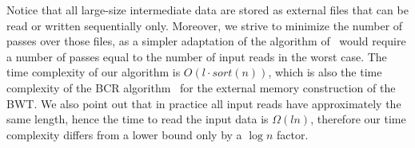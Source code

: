 \documentclass[runningheads,envcountsame,a4paper]{llncs}
\begin{document}
Notice that all large-size intermediate data are stored as external files that
can be read or written sequentially only.
Moreover, we strive to minimize the number of passes over those files, as a
simpler adaptation of the algorithm of~\cite{Bauer2011} would require a number
of passes equal to the number of input reads in the worst case.
The time complexity of our algorithm is $O(l \cdot  sort(n))$, which is also the
time complexity of the BCR algorithm~\cite{Bauer2013} for the external memory
construction of the BWT.
We also point out that in practice all input reads have approximately the same
length, hence the time to read the input data is $\Omega(ln)$, therefore our
time complexity differs from a lower bound only by a $\log n$ factor.








\begin{comment}
--------- non so dove vada-----------------


A key observation in our work is the fact that due to the fact that a
BWT consists of the symbols that precedes the lexicographic ordering of
suffixes of the reads of a collection, it is possible to "walk"
consecutively on the BWT of the collection of reads and of the reversed
version of the reads and then building a forward and backward extension
of a $Q$-substring by symbols of the alphabet lexicographically ordered.
All this can be done entirely using files for each symbol of the
alphabet and files for the BWT and its reversed version.
\end{comment}


\begin{comment}
descrizione The FM-index .... [inserire citazione FM-index]

With the advent of NGS data, the investigation of the BWT has moved
towards its use in indexing huge collections of texts, represented by
the reads of variable length.
The notion of Extended Borrows Wheeler has been proposed to deal with a
collection of texts~\cite{Bauer2011} and its potentiality in
Bioinformatics to index read data has been investigated in ....

While the BWT has been deeply used for the alignment of reads to a
reference genome, for the first time the BWT has been explored as a tool
for de novo assembly.

In~\cite{Simpson2010} Durbin addresses the problem of having a more
efficient space FM-index implementation of the string graph problem.

---results----

\end{comment}
\end{document}
